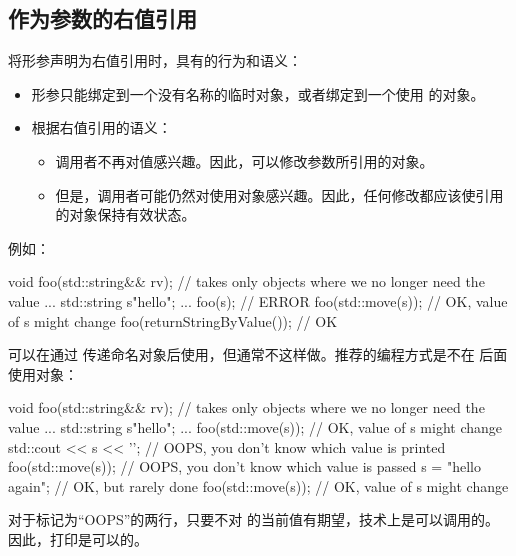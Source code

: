 \subsection{作为参数的右值引用}

将形参声明为右值引用时，具有的行为和语义：

\begin{itemize}
	\item 形参只能绑定到一个没有名称的临时对象，或者绑定到一个使用  的对象。
	\item 根据右值引用的语义：
	\begin{itemize}
		\item 调用者不再对值感兴趣。因此，可以修改参数所引用的对象。
		\item 但是，调用者可能仍然对使用对象感兴趣。因此，任何修改都应该使引用的对象保持有效状态。
	\end{itemize}
\end{itemize}

例如：

\begin{cppcode}
void foo(std::string&& rv); // takes only objects where we no longer need the value
...
std::string s{"hello"};
...
foo(s); // ERROR
foo(std::move(s)); // OK, value of s might change
foo(returnStringByValue()); // OK
\end{cppcode}

可以在通过  传递命名对象后使用，但通常不这样做。推荐的编程方式是不在  后面使用对象：

\begin{cppcode}
void foo(std::string&& rv); // takes only objects where we no longer need the value
...
std::string s{"hello"};
...
foo(std::move(s)); // OK, value of s might change
std::cout << s << '\n'; // OOPS, you don’t know which value is printed
foo(std::move(s)); // OOPS, you don’t know which value is passed
s = "hello again"; // OK, but rarely done
foo(std::move(s)); // OK, value of s might change
\end{cppcode}

对于标记为“OOPS”的两行，只要不对  的当前值有期望，技术上是可以调用的。因此，打印是可以的。




